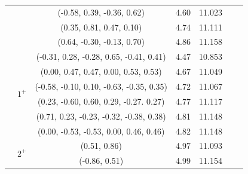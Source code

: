 \documentclass[prd,twocolumn,floatfix,nofootinbib]{revtex4}
\begin{document}
\begin{table}[!htbp]
\begin{tabular}{ccccccc}
                        &           &(-0.58, 0.39, -0.36, 0.62)                 &4.60	    &11.023 \\ 
                        &           &(0.35, 0.81, 0.47, 0.10)                   &4.74	    &11.111 \\ 
                        &           &(0.64, -0.30, -0.13, 0.70)                 &4.86	    &11.158 \\ 
                        &\multirow{6}{*}{$1^{+}$}
                                    &(-0.31, 0.28, -0.28, 0.65, -0.41, 0.41)    &4.47	    &10.853 \\ 
                        &           &(0.00, 0.47, 0.47, 0.00, 0.53, 0.53)       &4.67	    &11.049 \\ 
                        &           &(-0.58, -0.10, 0.10, -0.63, -0.35, 0.35)   &4.72	    &11.067 \\ 
                        &           &(0.23, -0.60, 0.60, 0.29, -0.27. 0.27)     &4.77	    &11.117 \\ 
                        &           &(0.71, 0.23, -0.23, -0.32, -0.38, 0.38)    &4.81	    &11.148 \\ 
                        &           &(0.00, -0.53, -0.53, 0.00, 0.46, 0.46)     &4.82	    &11.148 \\ 
                        &\multirow{2}{*}{$2^{+}$}
                                    &(0.51, 0.86)                               &4.97	    &11.093 \\ 
                        &           &(-0.86, 0.51)                              &4.99	    &11.154 \\ 
        \hline\hline
    \end{tabular}
\end{table}
\end{document}
